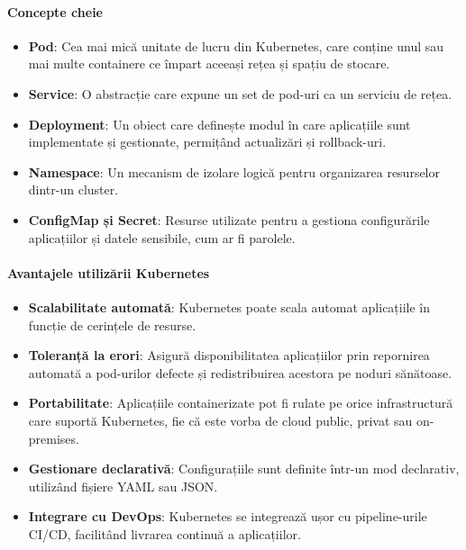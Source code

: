 \documentclass[titlepage,12pt]{article}
\begin{document}
\paragraph{Concepte cheie}
\begin{itemize}
    \item \textbf{Pod}: Cea mai mică unitate de lucru din Kubernetes, care conține unul sau mai multe containere ce împart aceeași rețea și spațiu de stocare.
    \item \textbf{Service}: O abstracție care expune un set de pod-uri ca un serviciu de rețea.
    \item \textbf{Deployment}: Un obiect care definește modul în care aplicațiile sunt implementate și gestionate, permițând actualizări și rollback-uri.
    \item \textbf{Namespace}: Un mecanism de izolare logică pentru organizarea resurselor dintr-un cluster.
    \item \textbf{ConfigMap și Secret}: Resurse utilizate pentru a gestiona configurările aplicațiilor și datele sensibile, cum ar fi parolele.
\end{itemize}

\paragraph{Avantajele utilizării Kubernetes}
\begin{itemize}
    \item \textbf{Scalabilitate automată}: Kubernetes poate scala automat aplicațiile în funcție de cerințele de resurse.
    \item \textbf{Toleranță la erori}: Asigură disponibilitatea aplicațiilor prin repornirea automată a pod-urilor defecte și redistribuirea acestora pe noduri sănătoase.
    \item \textbf{Portabilitate}: Aplicațiile containerizate pot fi rulate pe orice infrastructură care suportă Kubernetes, fie că este vorba de cloud public, privat sau on-premises.
    \item \textbf{Gestionare declarativă}: Configurațiile sunt definite într-un mod declarativ, utilizând fișiere YAML sau JSON.
    \item \textbf{Integrare cu DevOps}: Kubernetes se integrează ușor cu pipeline-urile CI/CD, facilitând livrarea continuă a aplicațiilor.
\end{itemize}
\end{document}
